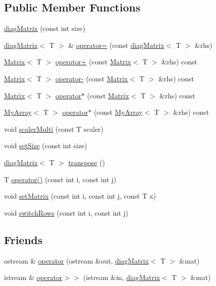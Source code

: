 \subsection*{Public Member Functions}
\begin{DoxyCompactItemize}
\item 
\hyperlink{classdiagMatrix_a93b7d45546b51cee1936ebcfe88abf5b}{diag\+Matrix} (const int size)
\item 
\hyperlink{classdiagMatrix}{diag\+Matrix}$<$ T $>$ \& \hyperlink{classdiagMatrix_a705486521d9b35d232faef4ffc0906f4}{operator=} (const \hyperlink{classdiagMatrix}{diag\+Matrix}$<$ T $>$ \&rhs)
\item 
\hyperlink{classMatrix}{Matrix}$<$ T $>$ \hyperlink{classdiagMatrix_aaeffbe6c2c66c9ec18ed99c4087d6b01}{operator+} (const \hyperlink{classMatrix}{Matrix}$<$ T $>$ \&rhs) const 
\item 
\hyperlink{classMatrix}{Matrix}$<$ T $>$ \hyperlink{classdiagMatrix_ab6cfc841c587e407454270ba86f68084}{operator-\/} (const \hyperlink{classMatrix}{Matrix}$<$ T $>$ \&rhs) const 
\item 
\hyperlink{classMatrix}{Matrix}$<$ T $>$ \hyperlink{classdiagMatrix_a8828d9c0ffb5b55134ee13c308fd8032}{operator$\ast$} (const \hyperlink{classMatrix}{Matrix}$<$ T $>$ \&rhs) const 
\item 
\hyperlink{classMyArray}{My\+Array}$<$ T $>$ \hyperlink{classdiagMatrix_a20fa62079a31063c7511574d70f6d198}{operator$\ast$} (const \hyperlink{classMyArray}{My\+Array}$<$ T $>$ \&rhs) const 
\item 
void \hyperlink{classdiagMatrix_a319efd9720b568daa3ea939ba785b6d6}{scaler\+Multi} (const T scaler)
\item 
void \hyperlink{classdiagMatrix_a4d5e30a4541016af727a1bcd0859d0bf}{set\+Size} (const int size)
\item 
\hyperlink{classdiagMatrix}{diag\+Matrix}$<$ T $>$ \hyperlink{classdiagMatrix_ae7656b1bf72b5a0dc3feca7c059c5443}{transpose} ()
\item 
T \hyperlink{classdiagMatrix_ab287eafb851eb4ef803bf9fcfcc563ee}{operator()} (const int i, const int j)
\item 
void \hyperlink{classdiagMatrix_a73390f0110a83969c8a00f2e0edeb8ca}{set\+Matrix} (const int i, const int j, const T x)
\item 
void \hyperlink{classdiagMatrix_a5ca87626d38ddff137d187e77d88c442}{switch\+Rows} (const int i, const int j)
\end{DoxyCompactItemize}
\subsection*{Friends}
\begin{DoxyCompactItemize}
\item 
ostream \& \hyperlink{classdiagMatrix_a0f1009e2f7ff04ee7bce62b30ea36c16}{operator} (ostream \&out, \hyperlink{classdiagMatrix}{diag\+Matrix}$<$ T $>$ \&mat)
\item 
istream \& \hyperlink{classdiagMatrix_a867c8d02a49ed9a614dbbeb543ace706}{operator$>$$>$} (istream \&in, \hyperlink{classdiagMatrix}{diag\+Matrix}$<$ T $>$ \&mat)
\end{DoxyCompactItemize}
